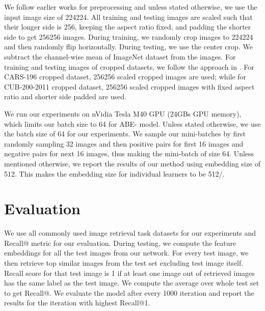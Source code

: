 \documentclass[runningheads]{llncs}
\begin{document}
We follow earlier works \cite{oh2016deep,wu2017sampling} for preprocessing and unless stated otherwise, we use the input image size of 224224.
All training and testing images are scaled such that their longer side is 256, keeping the aspect ratio fixed, and padding the shorter side to get 256256 images. During training, we randomly crop images to 224224 and then randomly flip horizontally.
During testing, we use the center crop. We subtract the channel-wise mean of ImageNet dataset from the images.
For training and testing images of cropped datasets, we follow the approach in \cite{wu2017sampling}.
For CARS-196 \cite{KrauseStarkDengFei-Fei_3DRR2013} cropped dataset, 256256 scaled cropped images are used; while for CUB-200-2011 \cite{WahCUB_200_2011} cropped dataset, 256256 scaled cropped images with fixed aspect ratio and shorter side padded are used.

We run our experiments on nVidia Tesla M40 GPU (24GBs GPU memory), which limits our batch size to 64 for ABE- model.
Unless stated otherwise, we use the batch size of 64 for our experiments.
We sample our mini-batches by first randomly sampling 32 images and then positive pairs for first 16 images and negative pairs for next 16 images, thus making the mini-batch of size 64.
Unless mentioned otherwise, we report the results of our method using embedding size of 512. This makes the embedding size for individual learners to be 512/.


 
\vspace{-3mm}
\section{Evaluation}
\vspace{-3mm}
We use all commonly used image retrieval task datasets for our experiments and Recall@ metric for our evaluation.
During testing, we compute the feature embeddings for all the test images from our network.
For every test image, we then retrieve top  similar images from the test set excluding test image itself.
Recall score for that test image is 1 if at least one image out of  retrieved images has the same label as the test image.
We compute the average over whole test set to get Recall@.
We evaluate the model after every 1000 iteration and report the results for the iteration with highest Recall@1.
\end{document}
